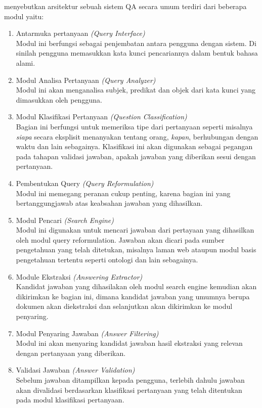 \citet*{ramprasath_hariharan} menyebutkan arsitektur sebuah sistem QA secara umum terdiri dari beberapa modul yaitu:
\begin{enumerate}
	\item Antarmuka pertanyaan \emph{(Query Interface)} \\
		Modul ini berfungsi sebagai penjembatan antara pengguna dengan sistem. Di sinilah pengguna memasukkan kata kunci pencariannya dalam bentuk bahasa alami.
	\item Modul Analisa Pertanyaan \emph{(Query Analyzer)} \\
		Modul ini akan menganalisa subjek, predikat dan objek dari kata kunci yang dimasukkan oleh pengguna.
	\item Modul Klasifikasi Pertanyaan \emph{(Question Classification)} \\
		Bagian ini berfungsi untuk memeriksa tipe dari pertanyaan seperti misalnya \emph{siapa} secara eksplisit menanyakan tentang orang, \emph{kapan}, berhubungan dengan waktu dan lain sebagainya. Klasifikasi ini akan digunakan sebagai pegangan pada tahapan validasi jawaban, apakah jawaban yang diberikan sesui dengan pertanyaan.
	\item Pembentukan Query \emph{(Query Reformulation)} \\
		Modul ini memegang peranan cukup penting, karena bagian ini yang bertanggungjawab atas keabsahan jawaban yang dihasilkan.
	\item Modul Pencari \emph{(Search Engine)} \\ 
		Modul ini digunakan untuk mencari jawaban dari pertayaan yang dihasilkan oleh modul query reformulation. Jawaban akan dicari pada sumber pengetahuan yang telah ditetukan, misalnya laman web ataupun modul basis pengetahuan tertentu seperti ontologi dan lain sebagainya.
	\item Module Ekstraksi \emph{(Answering Extractor)} \\ 
		Kandidat jawaban yang dihasilakan oleh modul search engine kemudian akan dikirimkan ke bagian ini, dimana kandidat jawaban yang umumnya berupa dokumen akan diekstraksi dan selanjutkan akan dikirimkan ke modul penyaring.
	\item Modul Penyaring Jawaban \emph{(Answer Filtering)} \\
		Modul ini akan menyaring kandidat jawaban hasil ekstraksi yang relevan dengan pertanyaan yang diberikan.
	\item Validasi Jawaban \emph{(Answer Validation)} \\ 
		Sebelum jawaban ditampilkan kepada pengguna, terlebih dahulu jawaban akan divalidasi berdasarkan klasifikasi pertanyaan yang telah ditentukan pada modul klasifikasi pertanyaan.
\end{enumerate}
